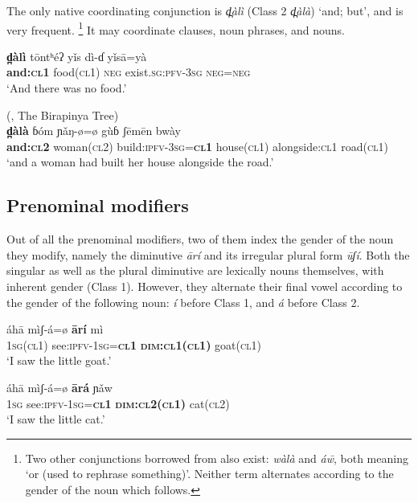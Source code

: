 \documentclass[output=collectionpaper,hidelinks]{langscibook}
\theoremstyle{remark}
\begin{document}
The only native coordinating conjunction is \emph{d̪àlì} (Class 2
\emph{d̪àlà}) `and; but', and is very frequent.%
\footnote{Two other conjunctions borrowed from  also exist: \emph{wàlà}
and \emph{áw̄}, both meaning `or (used to rephrase something)'.  Neither term
alternates according to the gender of the noun which follows.} %
It may coordinate clauses, noun phrases, and nouns.

\ea
\gll  \textbf{d̪àlì} tōntʰéʔ yǐs\aMidLow{} dì-ɗ yǐsā=yà \\
 \textbf{and:\textsc{cl1}} food(\textsc{cl1}) \textsc{neg} exist.\textsc{sg}:\textsc{pfv}-\textsc{3sg} \textsc{neg}=\textsc{neg} \\
\glt `And there was no food.' \\
\z

\ea
(\citealt{James1979}, The Birapinya Tree)\\
\gll  \textbf{d̪àlà} ɓóm ɲǎŋ-ø=ø gùɓ ʃēmēn bwày \\
 \textbf{and:\textsc{cl2}} woman(\textsc{cl2}) build:\textsc{ipfv}-\textsc{3sg}=\textbf{\textsc{cl1}} house(\textsc{cl1}) alongside:\textsc{cl1} road(\textsc{cl1}) \\
\glt `and a woman had built her house alongside the road.' \\
\z


\subsection{Prenominal modifiers}
\label{sec:Don:Prenominal_modifiers}

Out of all the prenominal modifiers, two of them index the gender of the noun
they modify, namely the diminutive \emph{ārí} and its irregular plural form
\emph{ūʃí}.  Both the singular as well as the plural diminutive are lexically
nouns themselves, with inherent gender (Class 1).  However, they alternate their
final vowel according to the gender of the following noun: \emph{í} before Class
1, and \emph{á} before Class 2.

\ea
\gll  áhā mìʃ-á=ø \textbf{ārí} mì \\
 \textsc{1sg}(\textsc{cl1}) see:\textsc{ipfv}-\textsc{1sg}=\textbf{\textsc{cl1}} \textbf{\textsc{dim:cl1}(\textsc{cl1})} goat(\textsc{cl1}) \\
\glt `I saw the little goat.' \\
\z

\ea
\gll  áhā mìʃ-á=ø \textbf{ārá} ɲǎw \\
 \textsc{1sg} see:\textsc{ipfv}-\textsc{1sg}=\textbf{\textsc{cl1}} \textbf{\textsc{dim:cl2}(\textsc{cl1})} cat(\textsc{cl2}) \\
\glt `I saw the little cat.' \\
\z
\end{document}
